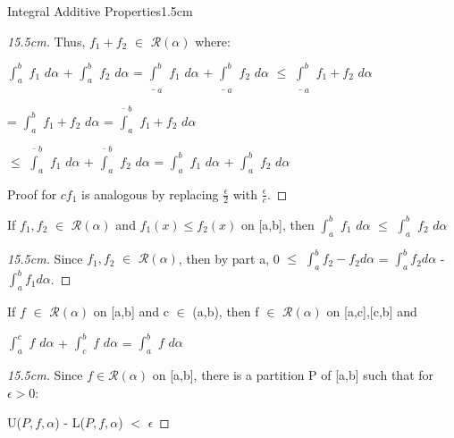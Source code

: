 \begin{ltheorem}{Integral Additive Properties}{1.5cm}
\begin{proof}[15.5cm]
                Thus, $f_1+f_2$ $\in$ $\mathscr{R}(\alpha)$ where:

                \hspace{0.5cm}
                $\int_a^b$ $f_1$ $d\alpha$
                + $\int_a^b$ $f_2$ $d\alpha$
                = $\underline{\int}_a^b$ $f_1$ $d\alpha$
                + $\underline{\int}_a^b$ $f_2$ $d\alpha$
                $\leq$ $\underline{\int}_a^b$ $f_1+f_2$ $d\alpha$

                \hspace{4.3cm}
                = $\int_a^b$ $f_1+f_2$ $d\alpha$
                = $\overline{\int}_a^b$ $f_1+f_2$ $d\alpha$
                
                \hspace{4.3cm}
                $\leq$ $\overline{\int}_a^b$ $f_1$ $d\alpha$
                + $\overline{\int}_a^b$ $f_2$ $d\alpha$
                = $\int_a^b$ $f_1$ $d\alpha$
                + $\int_a^b$ $f_2$ $d\alpha$

                Proof for $cf_1$ is analogous by replacing $\frac{\epsilon}{2}$
                with $\frac{\epsilon}{c}$.                
            \end{proof}

    \item If $f_1,f_2$ $\in$ $\mathscr{R}(\alpha)$ and $f_1(x) \leq f_2(x)$
    on [a,b], then $\int_a^b$ $f_1$ $d\alpha$ $\leq$ $\int_a^b$ $f_2$ $d\alpha$

        \begin{proof}[15.5cm]
            Since $f_1,f_2$ $\in$ $\mathscr{R}(\alpha)$, then by part a,
            0 $\leq$ $\int_a^b f_2-f_2 d\alpha$
            = $\int_a^b f_2 d\alpha$ - $\int_a^b f_1 d\alpha$.
        \end{proof}

        \newpage

    \item If $f$ $\in$ $\mathscr{R}(\alpha)$ on [a,b] and c $\in$ (a,b),
    then f $\in$ $\mathscr{R}(\alpha)$ on [a,c],[c,b] and
        
        \hspace{0.5cm}
        $\int_a^c$ $f$ $d\alpha$ + $\int_c^b$ $f$ $d\alpha$
        = $\int_a^b$ $f$ $d\alpha$

        \begin{proof}[15.5cm]
            Since $f \in \mathscr{R}(\alpha)$ on [a,b], there is a
            partition P of [a,b] such that for $\epsilon > 0$:

            \hspace{0.5cm}
            U($P,f,\alpha$) - L($P,f,\alpha$) $<$ $\epsilon$


\end{proof}
\end{ltheorem}
